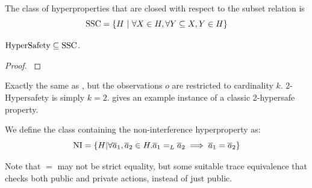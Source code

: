 \begin{definition}
  The class of hyperproperties that are closed with respect to the subset relation is
  $$
  \cSS = \left\{H\ |\ \forall X\in H, \forall Y\subseteq X, Y \in H\right\}
  $$
\end{definition}

\begin{lemma}
  $\text{HyperSafety}\subseteq\text{SSC}$.
\end{lemma}
\begin{proof}
  \cite{clarkson08}
\end{proof}

\begin{definition}[K-Hypersafety]
  Exactly the same as , but the observations $o$ are restricted to cardinality $k$.
  2-Hypersafety is simply $k=2$.  gives an example instance of a classic 2-hypersafe property.
\end{definition}

\begin{definition}\label{def:ni}
  We define the class containing the non-interference hyperproperty as:
  $$
  \text{NI} = \left\{ H | \forall \overline{a}_{1},\overline{a}_{2}\in H. {\overline{a}_{1}}=_L{\overline{a}_{2}}\implies\overline{a}_{1}=\overline{a}_{2} \right\}
  $$
\end{definition}
Note that $=$ may not be strict equality, but some suitable trace equivalence that checks both public and private actions, instead of just public.

